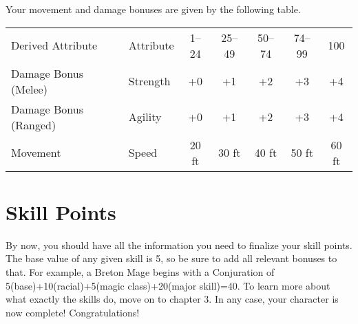 Your movement and damage bonuses are given by the following table.
\begin{center}
\begin{tabular}{llccccc}
\rowcolor{gray!50}
Derived Attribute & Attribute & 1--24 & 25--49 & 50--74 & 74--99 & 100\\
Damage Bonus (Melee) & Strength & +0 & +1 & +2 & +3 & +4 \\
Damage Bonus (Ranged) & Agility & +0 & +1 & +2 & +3 & +4 \\
Movement & Speed & 20 ft & 30 ft & 40 ft & 50 ft & 60 ft\\
\end{tabular}
\end{center}

\section{Skill Points}
By now, you should have all the information you need to finalize your skill points. The base value of any given skill is 5, so be sure to add all relevant bonuses to that. For example, a Breton Mage begins with a Conjuration of 5(base)+10(racial)+5(magic class)+20(major skill)=40. To learn more about what exactly the skills do, move on to chapter 3. In any case, your character is now complete! Congratulations!
